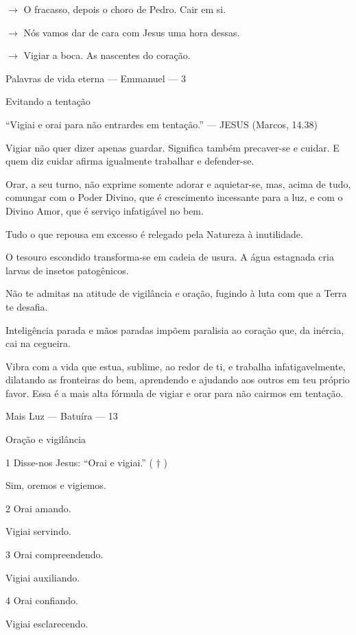 \documentclass{rbfin}
\begin{document}
\begin{multicols}{2}
$\rightarrow$ O fracasso, depois o choro de Pedro. Cair em si.

$\rightarrow$ Nós vamos dar de cara com Jesus uma hora dessas.

$\rightarrow$ Vigiar a boca. As nascentes do coração.

\dotfill

\newpage

Palavras de vida eterna — Emmanuel --- 3

Evitando a tentação

“Vigiai e orai para não entrardes em tentação.” — JESUS (Marcos, 14.38)

Vigiar não quer dizer apenas guardar. Significa também precaver-se e cuidar. E quem diz cuidar afirma igualmente trabalhar e defender-se.

Orar, a seu turno, não exprime somente adorar e aquietar-se, mas, acima de tudo, comungar com o Poder Divino, que é crescimento incessante para a luz, e com o Divino Amor, que é serviço infatigável no bem.

Tudo o que repousa em excesso é relegado pela Natureza à inutilidade.

O tesouro escondido transforma-se em cadeia de usura. A água estagnada cria larvas de insetos patogênicos.

Não te admitas na atitude de vigilância e oração, fugindo à luta com que a Terra te desafia.

Inteligência parada e mãos paradas impõem paralisia ao coração que, da inércia, cai na cegueira.

Vibra com a vida que estua, sublime, ao redor de ti, e trabalha infatigavelmente, dilatando as fronteiras do bem, aprendendo e ajudando aos outros em teu próprio favor. Essa é a mais alta fórmula de vigiar e orar para não cairmos em tentação.

\dotfill

\newpage

Mais Luz --- Batuíra --- 13

Oração e vigilância

1 Disse-nos Jesus: “Orai e vigiai.” ( † )

Sim, oremos e vigiemos.


2 Orai amando.

Vigiai servindo.


3 Orai compreendendo.

Vigiai auxiliando.


4 Orai confiando.

Vigiai esclarecendo.



\end{multicols}
\end{document}
